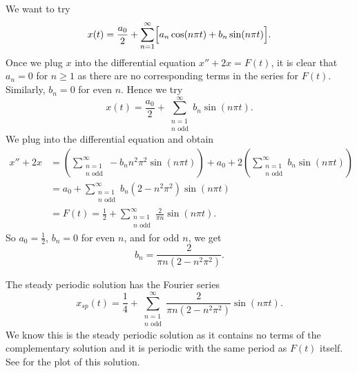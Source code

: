 \begin{example}
We want to try
\begin{equation*}
x(t) = \frac{a_0}{2} + \sum_{n=1}^\infty
\Bigl[
a_n \cos (n \pi t) +
b_n \sin (n \pi t)
\Bigr] .
\end{equation*}
Once we plug $x$ into the differential equation $x''+2x = F(t)$,
it is clear that $a_n = 0$ for $n \geq 1$ as there are no corresponding terms
in the series for
$F(t)$.  Similarly, $b_n = 0$ for even $n$.  Hence we try
\begin{equation*}
x(t) = \frac{a_0}{2} +
\sum_{\substack{n=1 \\ n \text{ odd}}}^\infty
b_n \sin (n \pi t) .
\end{equation*}
We plug into the differential equation and obtain
\begin{equation*}
\begin{split}
x'' + 2 x & =
\left(
\sum_{\substack{n=1 \\ n \text{ odd}}}^\infty
- b_n n^2 \pi^2 \sin (n \pi t)
\right)
+ 
a_0 +
2
\left(
\sum_{\substack{n=1 \\ n \text{ odd}}}^\infty
b_n \sin (n \pi t)
\right)
\\
& =
a_0 +
\sum_{\substack{n=1 \\ n \text{ odd}}}^\infty
b_n (2 - n^2 \pi^2 ) \sin (n \pi t)
\\
& =
F(t) = \frac{1}{2} + \sum_{\substack{n=1 \\ n \text{ odd}}}^\infty
\frac{2}{\pi n} \sin (n \pi t) .
\end{split}
\end{equation*}
So $a_0 = \frac{1}{2}$, $b_n = 0$ for even $n$, and for odd $n$, we
get
\begin{equation*}
b_n = 
\frac{2}{\pi n (2 - n^2 \pi^2 )} .
\end{equation*}

The steady periodic solution has the Fourier series
\begin{equation*}
x_{sp}(t) = \frac{1}{4} + \sum_{\substack{n=1 \\ n \text{ odd}}}^\infty
\frac{2}{\pi n (2 - n^2 \pi^2 )}
\sin (n \pi t) .
\end{equation*}
We know this is the steady periodic solution as it contains no terms 
of the complementary solution and it is periodic with the same period as
$F(t)$ itself.  See  for the plot of this solution.
\begin{myfig}
\capstart
{}
\caption{Plot of the steady periodic solution $x_{sp}$ of
.%
\label{afs:steadyexfig}}
\end{myfig}
\end{example}

